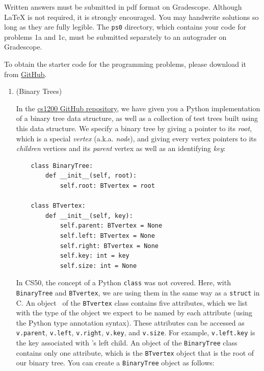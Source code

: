 \documentclass[11pt]{article}
\begin{document}
Written answers must be submitted in pdf format on Gradescope. Although \LaTeX{} is not required, it is strongly encouraged. You may handwrite solutions so long as they are fully legible. The \texttt{ps0} directory, which contains your code for problems 1a and 1c, must be submitted separately to an autograder on Gradescope.

To obtain the starter code for the programming problems, please download it from \href{https://github.com/Harvard-CS-1200/2026-Spring/tree/main/psets/}{GitHub}.

 \newcommand{\children}{\mathit{children}}
 \newcommand{\parent}{\mathit{parent}}

\begin{enumerate}
\item (Binary Trees)

 In the \href{https://github.com/Harvard-CS-1200/2026-Spring}{cs1200 GitHub repository},
 we have given you a Python implementation of a binary tree data structure, as well as a collection of test trees built using this data structure.  We specify a binary tree by giving a pointer to its {\em root}, which is a special {\em vertex} (a.k.a. {\em node}), and giving every vertex pointers to its {\em children} vertices and its {\em parent} vertex as well as an identifying {\em key}:

 \begin{verbatim}
    class BinaryTree:
        def __init__(self, root):
            self.root: BTvertex = root

    class BTvertex:
        def __init__(self, key):
            self.parent: BTvertex = None
            self.left: BTvertex = None
            self.right: BTvertex = None
            self.key: int = key
            self.size: int = None
 \end{verbatim}


 In CS50, the concept of a Python \texttt{class} was not covered. Here, with \texttt{BinaryTree} and \texttt{BTvertex}, we are using them in the same way as a \texttt{struct} in C. An object \btv\ of the \texttt{BTvertex} class contains five attributes, which we list with the type of the object we expect to be named by each attribute (using the Python type annotation syntax). These attributes can be accessed as \texttt{v.parent}, \texttt{v.left}, \texttt{v.right}, \texttt{v.key}, and \texttt{v.size}.
 For example, \texttt{v.left.key} is the key associated with \btv's left child. An object of the \texttt{BinaryTree} class contains only one attribute, which is the \texttt{BTvertex} object that is the root of our binary tree. You can create a \texttt{BinaryTree} object as follows:


\end{enumerate}
\end{document}
